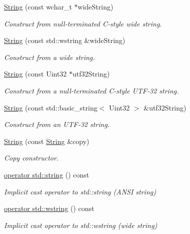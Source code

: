 \begin{DoxyCompactItemize}
\hyperlink{classsf_1_1String_a5742d0a9b0c754f711820c2b5c40fa55}{String} (const wchar\-\_\-t $\ast$wide\-String)
\begin{DoxyCompactList}\small\item\em Construct from null-\/terminated C-\/style wide string. \end{DoxyCompactList}\item 
\hyperlink{classsf_1_1String_a5e38151340af4f9a5f74ad24c0664074}{String} (const std\-::wstring \&wide\-String)
\begin{DoxyCompactList}\small\item\em Construct from a wide string. \end{DoxyCompactList}\item 
\hyperlink{classsf_1_1String_aea3629adf19f9fe713d4946f6c75b214}{String} (const Uint32 $\ast$utf32\-String)
\begin{DoxyCompactList}\small\item\em Construct from a null-\/terminated C-\/style U\-T\-F-\/32 string. \end{DoxyCompactList}\item 
\hyperlink{classsf_1_1String_a6eee86dbe75d16bbcc26e97416c2e1ca}{String} (const std\-::basic\-\_\-string$<$ Uint32 $>$ \&utf32\-String)
\begin{DoxyCompactList}\small\item\em Construct from an U\-T\-F-\/32 string. \end{DoxyCompactList}\item 
\hyperlink{classsf_1_1String_af862594d3c4070d8ddbf08cf8dce4f59}{String} (const \hyperlink{classsf_1_1String}{String} \&copy)
\begin{DoxyCompactList}\small\item\em Copy constructor. \end{DoxyCompactList}\item 
\hyperlink{classsf_1_1String_a3664f92c3b488bf9f60f6b8eafe1844d}{operator std\-::string} () const 
\begin{DoxyCompactList}\small\item\em Implicit cast operator to std\-::string (A\-N\-S\-I string) \end{DoxyCompactList}\item 
\hyperlink{classsf_1_1String_a20d50d45020d1dbe1779dda69ee83732}{operator std\-::wstring} () const 
\begin{DoxyCompactList}\small\item\em Implicit cast operator to std\-::wstring (wide string) \end{DoxyCompactList}\item 

\end{DoxyCompactItemize}
